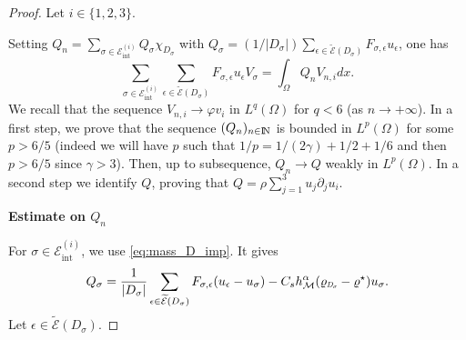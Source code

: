 \documentclass{amsart}
\numberwithin{equation}{section}
\begin{document}
\begin{proof}
Let $i \in \{1,2,3\}$.

Setting $Q_n=\sum_{{{\sigma}} \in {{\mathcal E}_{\mathrm{int}}^{(i)}}} Q_{{\sigma}} \chi_{D_{{\sigma}}}$ with $Q_{{\sigma}}=(1/|D_{{\sigma}}|)\sum_{{\epsilon} \in {\widetilde {{\mathcal E}}}(D_{{\sigma}})}
F_{{{\sigma}},{\epsilon}} u_{\epsilon}$, one has 
\begin{equation}
\sum_{{{\sigma}} \in {{\mathcal E}_{\mathrm{int}}^{(i)}}} \sum_{{\epsilon} \in {\widetilde {{\mathcal E}}}(D_{{\sigma}})}
F_{{{\sigma}},{\epsilon}} u_{\epsilon} V_{{\sigma}}= \int_\Omega Q_n V_{n,i} dx.
\end{equation}
We recall that the sequence $V_{n,i} \to {\varphi} v_i$  in $L^q(\Omega)$ for $q<6$ (as ${{n {\rightarrow} + \infty}}$).
In a first step, we prove that the sequence $(Q_n)_{{n \in {\ifmmode{\rm	I\mkern-3.1mu
N\mkern0.5mu}\else{\rm I\kern-.16em
N\hskip0.5pt\ }\fi\relax}}}$ is bounded in $L^p(\Omega)$ for some $p >6/5$
(indeed we will have $p$ such that $1/p= 1/(2{\gamma}) + 1/2 + 1/6$ and then $p > 6/5$ since ${\gamma}>3$).
Then, up to subsequence, $Q_n \to Q$ weakly in $L^p(\Omega)$. In a second step we identify $Q$, proving that
$Q=\rho \sum_{j=1}^3 u_j \partial_j u_i$.

{\bf Estimate on $Q_n$}

For ${{\sigma}} \in {{\mathcal E}_{\mathrm{int}}^{(i)}}$, we use \eqref{eq:mass_D_imp}. 
It gives
\begin{equation}
Q_{{\sigma}}=\frac{1}{|D_{{\sigma}}|}\sum_{{\epsilon} \in {\widetilde {{\mathcal E}}}(D_{{\sigma}})}
F_{{{\sigma}},{\epsilon}} (u_{\epsilon}-u_{{\sigma}}) - {C_s} h_{{\mathcal M}}^\alpha( {\varrho}_{{\scalebox{0.6}{$D_{{\sigma}}$}}} - {\varrho}^\star)u_{{\sigma}}.
\label{cucu}
\end{equation}
Let ${\epsilon} \in {\widetilde {{\mathcal E}}}(D_{{\sigma}})$.


\end{proof}
\end{document}
